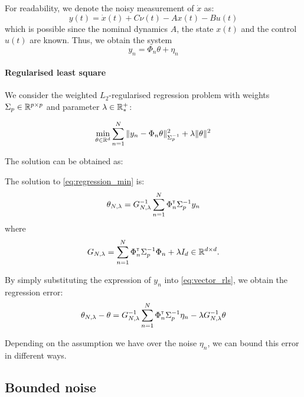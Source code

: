 \documentclass{article}
\begin{document}
For readability, we denote the noisy measurement of $\dot{x}$ as:
\begin{equation}
\label{eq:measurement}
    y(t) = \dot{x}(t) + C\nu(t) - A x(t) - Bu(t)
\end{equation}
which is possible since the nominal dynamics $A$, the state $x(t)$ and the control $u(t)$ are known.
Thus, we obtain the system
\[
y_n = \Phi_n\theta + \eta_n
\]

\paragraph{Regularised least square} We consider the weighted $L_2$-regularised regression problem with weights  $\Sigma_p\in\mathbb{R}^{p\times p}$ and parameter $\lambda\in\mathbb{R}^+_*$:


\begin{equation}
    \label{eq:regression_min}
    \min_{\theta\in\mathbb{R}^d} \sum_{n=1}^N \|y_n -\Phi_n\theta\|_{\Sigma_p^{-1}}^2 + \lambda\|\theta\|_{}^2
\end{equation}


The solution can be obtained as:

\begin{proposition}
\label{prop:regularized_solution}
The solution to \eqref{eq:regression_min} is:
\begin{equation}
    \label{eq:vector_rls}
    \theta_{N,\lambda} = G_{N, \lambda}^{-1} \sum_{n=1}^N \Phi_n^{\mathsf{\scriptscriptstyle T}} \Sigma_p^{-1} y_n
\end{equation}
where 
\begin{equation*}
    G_{N, \lambda} = \sum_{n=1}^N \Phi_{n}^{\mathsf{\scriptscriptstyle T}}\Sigma_p^{-1}\Phi_{n}  + \lambda I_d \in \mathbb{R}^{d\times d}.
\end{equation*}
\end{proposition}

By simply substituting the expression of $y_n$ into \eqref{eq:vector_rls}, we obtain the regression error:
\begin{align}
    \theta_{N,\lambda} - \theta = G_{N, \lambda}^{-1}\sum_{n=1}^N \Phi_n^{\mathsf{\scriptscriptstyle T}} \Sigma_p^{-1}\eta_n - \lambda G_{N, \lambda}^{-1}\theta 
\end{align}


Depending on the assumption we have over the noise $\eta_n$, we can bound this error in different ways.


\subsection{Bounded noise}
\end{document}
